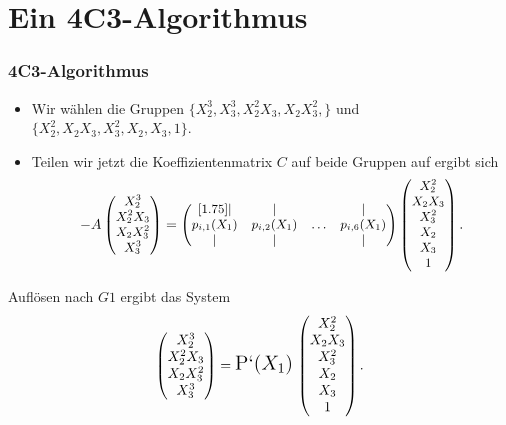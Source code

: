 \documentclass[11pt]{beamer}
\theoremstyle{custom}
\theoremstyle{custom}
\begin{document}
	\section{Ein 4C3-Algorithmus}
	\begin{frame}
		\frametitle{4C3-Algorithmus}
		\begin{itemize}
			\item Wir wählen die Gruppen $\{X_{2}^3,X_{3}^3,X_{2}^2X_{3},X_{2}X_{3}^2,\}$ und $\{X_{2}^2,X_{2}X_{3},X_{3}^2,X_{2},X_{3},1\}$.\\ \pause
			
			\item Teilen wir jetzt die Koeffizientenmatrix $C$ auf beide Gruppen auf ergibt sich 
			\begin{equation*}
				\small
				-A
				\begin{pmatrix}
					X_{2}^3\\
					X_{2}^2X_{3}\\
					X_{2}X_{3}^2\\
					X_{3}^3
				\end{pmatrix}
				=
				\begin{pmatrix}[1.75]
					\vert & \vert &   & \vert\\
					p_{i,1}(X_{1})&p_{i,2}(X_{1})& \ldots&p_{i,6}(X_{1})\\
					\vert & \vert & & \vert
				\end{pmatrix}
				\begin{pmatrix}
					X_{2}^2\\
					X_{2}X_{3}\\
					X_{3}^2\\
					X_{2}\\
					X_{3}\\
					1
				\end{pmatrix}.
			\end{equation*}
		\end{itemize}
	\end{frame}
	\begin{frame}
		Auflösen nach $G1$ ergibt das System
		\begin{equation*}
			\begin{pmatrix}
				X_{2}^3\\
				X_{2}^2X_{3}\\
				X_{2}X_{3}^2\\
				X_{3}^3
			\end{pmatrix}
			=
			{\Large \text{P`($X_1$)}} \,
			\begin{pmatrix}
				X_{2}^2\\
				X_{2}X_{3}\\
				X_{3}^2\\
				X_{2}\\
				X_{3}\\
				1
			\end{pmatrix}.
		\end{equation*}
	\end{frame}
\end{document}
